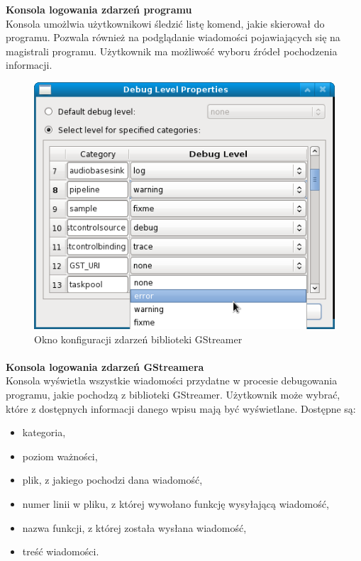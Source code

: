 \documentclass[12pt]{article}
\begin{document}
\textbf{Konsola logowania zdarzeń programu} \\
Konsola umożlwia użytkownikowi śledzić listę komend, jakie skierował do programu. Pozwala również na podglądanie wiadomości pojawiających się na magistrali programu. Użytkownik ma możliwość wyboru źródeł pochodzenia informacji.
\begin{figure}[H]
  \includegraphics[width=130mm]{img/debug-level-properties.png}
  \caption{Okno konfiguracji zdarzeń biblioteki GStreamer}
  \label{fig:debugLevelProperties}
\end{figure}
\paragraph{}\vspace{-3mm}
\textbf{Konsola logowania zdarzeń GStreamera} \\
Konsola wyświetla wszystkie wiadomości przydatne w procesie debugowania programu, jakie pochodzą z biblioteki GStreamer. Użytkownik może wybrać, które z dostępnych informacji danego wpisu mają być wyświetlane. Dostępne są:
\begin{itemize}
 \setlength{\itemsep}{0em}
\item kategoria,
\item poziom ważności,
\item plik, z jakiego pochodzi dana wiadomość,
\item numer linii w pliku, z której wywołano funkcję wysyłającą wiadomość,
\item nazwa funkcji, z której została wysłana wiadomość,
\item treść wiadomości.
\end{itemize}
\end{document}
